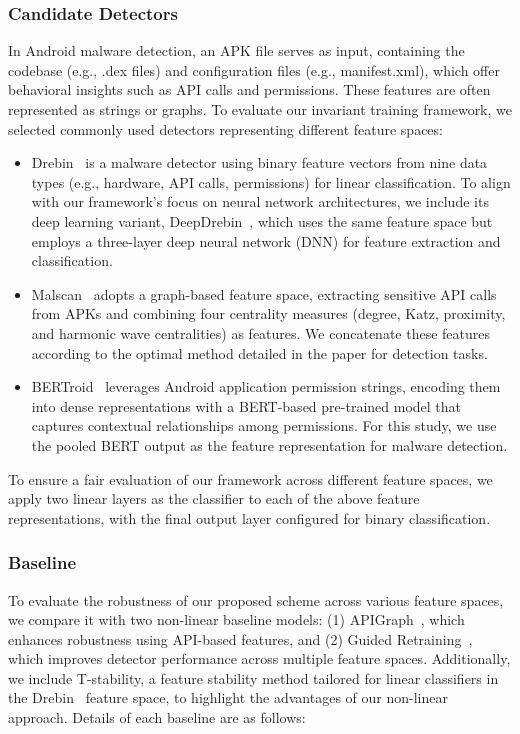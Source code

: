 

\subsubsection{Candidate Detectors}
In Android malware detection, an APK file serves as input, containing the codebase (e.g., .dex files) and configuration files (e.g., manifest.xml), which offer behavioral insights such as API calls and permissions. These features are often represented as strings or graphs. To evaluate our invariant training framework, we selected commonly used detectors representing different feature spaces:
\begin{itemize}
    \item Drebin~\cite{Arpdrebin} is a malware detector using binary feature vectors from nine data types (e.g., hardware, API calls, permissions) for linear classification. To align with our framework's focus on neural network architectures, we include its deep learning variant, DeepDrebin~\cite{Grossedeepdrebin}, which uses the same feature space but employs a three-layer deep neural network (DNN) for feature extraction and classification.
    \item Malscan~\cite{malscan} adopts a graph-based feature space, extracting sensitive API calls from APKs and combining four centrality measures (degree, Katz, proximity, and harmonic wave centralities) as features. We concatenate these features according to the optimal method detailed in the paper for detection tasks.
    \item BERTroid~\cite{bertroid} leverages Android application permission strings, encoding them into dense representations with a BERT-based pre-trained model that captures contextual relationships among permissions. For this study, we use the pooled BERT output as the feature representation for malware detection.
    
\end{itemize}
To ensure a fair evaluation of our framework across different feature spaces, we apply two linear layers as the classifier to each of the above feature representations, with the final output layer configured for binary classification.

\subsubsection{Baseline}
To evaluate the robustness of our proposed scheme across various feature spaces, we compare it with two non-linear baseline models: (1) APIGraph~\cite{apigraph}, which enhances robustness using API-based features, and (2) Guided Retraining~\cite{guide_retraining}, which improves detector performance across multiple feature spaces. Additionally, we include T-stability, a feature stability method tailored for linear classifiers in the Drebin~\cite{Arpdrebin} feature space, to highlight the advantages of our non-linear approach. Details of each baseline are as follows:

